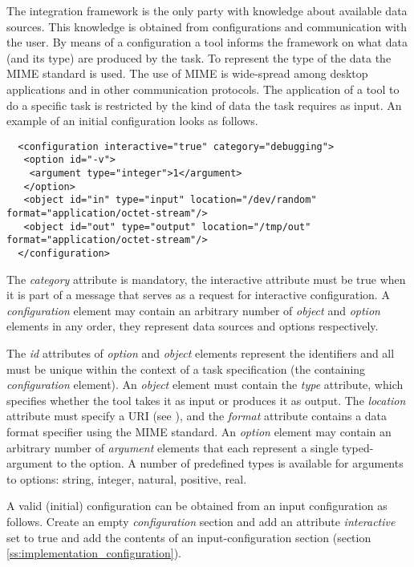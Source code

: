 \documentclass{article}
\begin{document}
   The integration framework is the only party with knowledge about available
   data sources. This knowledge is obtained from configurations and
   communication with the user. By means of a configuration a tool informs the
   framework on what data (and its type) are produced by the task. To represent
   the type of the data the MIME standard is used. The use of MIME is
   wide-spread among desktop applications and in other communication protocols.
   The application of a tool to do a specific task is restricted by the kind of
   data the task requires as input. An example of an initial configuration
   looks as follows.

   \small \begin{verbatim}
  <configuration interactive="true" category="debugging">
   <option id="-v">
    <argument type="integer">1</argument>
   </option>
   <object id="in" type="input" location="/dev/random" format="application/octet-stream"/>
   <object id="out" type="output" location="/tmp/out" format="application/octet-stream"/>
  </configuration>\end{verbatim}
  \normalsize

   \noindent The \textit{category} attribute is mandatory, the interactive
   attribute must be true when it is part of a message that serves as a request
   for interactive configuration.  A \textit{configuration} element may contain
   an arbitrary number of \textit{object} and \textit{option} elements in any
   order, they represent data sources and options respectively.
   
   The \textit{id} attributes of \textit{option} and \textit{object} elements
   represent the identifiers and all must be unique within the context of a
   task specification (the containing \textit{configuration} element).  An
   \textit{object} element must contain the \textit{type} attribute, which
   specifies whether the tool takes it as input or produces it as output. The
   \textit{location} attribute must specify a URI (see \cite{rfc3305}), and the
   \textit{format} attribute contains a data format specifier using the MIME
   standard.  An \textit{option} element may contain an arbitrary number of
   \textit{argument} elements that each represent a single typed-argument to
   the option. A number of predefined types is available for arguments to
   options: string, integer, natural, positive, real.

   A valid (initial) configuration can be obtained from an input configuration
   as follows.  Create an empty \textit{configuration} section and add an
   attribute \textit{interactive} set to true and add the contents of an
   input-configuration section (section \ref{ss:implementation_configuration}).
\end{document}
